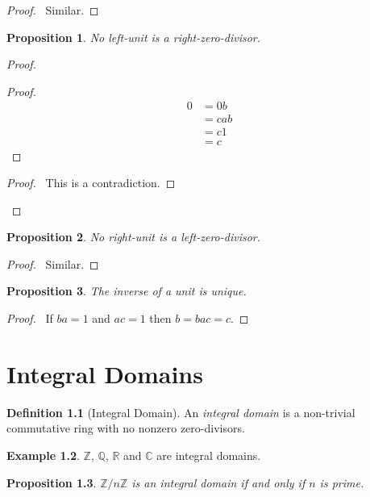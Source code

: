 \documentclass{book}
\let\qed\relax
\newtheorem{prop}{Proposition}[chapter]
\theoremstyle{definition}
\newtheorem{df}[prop]{Definition}
\newtheorem{ex}[prop]{Example}
\begin{document}
\begin{proof}
\pf\ Similar. \qed
\end{proof}

\begin{prop}
No left-unit is a right-zero-divisor.
\end{prop}

\begin{proof}
\pf
{}
\begin{proof}
	\pf
	\begin{align*}
		0 & = 0b \\
		& = cab \\
		& = c1 \\
		& = c
	\end{align*}
\end{proof}
\qedstep
\begin{proof}
	\pf\ This is a contradiction.
\end{proof}
\qed
\end{proof}

\begin{prop}
No right-unit is a left-zero-divisor.
\end{prop}

\begin{proof}
\pf\ Similar. \qed
\end{proof}

\begin{prop}
The inverse of a unit is unique.
\end{prop}

\begin{proof}
\pf\ If $ba = 1$ and $ac = 1$ then $b = bac = c$. \qed
\end{proof}

\chapter{Integral Domains}

\begin{df}[Integral Domain]
An \emph{integral domain} is a non-trivial commutative ring with no nonzero zero-divisors.
\end{df}

\begin{ex}
$\mathbb{Z}$, $\mathbb{Q}$, $\mathbb{R}$ and $\mathbb{C}$ are integral domains.
\end{ex}

\begin{prop}
$\mathbb{Z} / n \mathbb{Z}$ is an integral domain if and only if $n$ is prime.
\end{prop}
\end{document}
